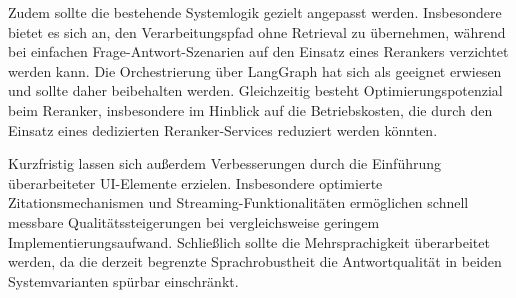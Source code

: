 Zudem sollte die bestehende Systemlogik gezielt angepasst werden.
Insbesondere bietet es sich an, den Verarbeitungspfad ohne Retrieval zu übernehmen, während bei einfachen Frage-Antwort-Szenarien auf den Einsatz eines Rerankers verzichtet werden kann.
Die Orchestrierung über LangGraph hat sich als geeignet erwiesen und sollte daher beibehalten werden.
Gleichzeitig besteht Optimierungspotenzial beim Reranker, insbesondere im Hinblick auf die Betriebskosten, die durch den Einsatz eines dedizierten Reranker-Services reduziert werden könnten.

Kurzfristig lassen sich außerdem Verbesserungen durch die Einführung überarbeiteter UI-Elemente erzielen.
Insbesondere optimierte Zitationsmechanismen und Streaming-Funktionalitäten ermöglichen schnell messbare Qualitätssteigerungen bei vergleichsweise geringem Implementierungsaufwand.
Schließlich sollte die Mehrsprachigkeit überarbeitet werden, da die derzeit begrenzte Sprachrobustheit die Antwortqualität in beiden Systemvarianten spürbar einschränkt.